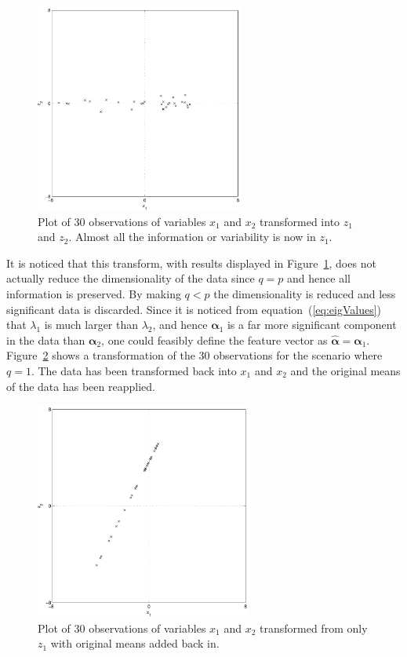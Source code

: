 \begin{figure}[!]
  \begin{center}
    \includegraphics[width=260px]{30observationsBarTrans.pdf}
    \caption{Plot of 30 observations of variables $x_1$ and $x_2$ transformed into $z_1$ and $z_2$. Almost all the information or variability is now in $z_1$.}\label{fig:30observationsBarTrans}
  \end{center}
\end{figure}

It is noticed that this transform, with results displayed in Figure~\ref{fig:30observationsBarTrans}, does not actually reduce the dimensionality of the data since $q=p$ and hence all information is preserved. By making $q<p$ the dimensionality is reduced and less significant data is discarded. Since it is noticed from equation~(\ref{eq:eigValues}) that $\lambda_1$ is much larger than $\lambda_2$, and hence $\boldsymbol\alpha_1$ is a far more significant component in the data than $\boldsymbol\alpha_2$, one could feasibly define the feature vector as $\hat{\boldsymbol\alpha} = \boldsymbol\alpha_1$. Figure~\ref{fig:30observationsFinal} shows a transformation of the 30 observations for the scenario where $q=1$. The data has been transformed back into $x_1$ and $x_2$ and the original means of the data has been reapplied.

\begin{figure}[!]
  \begin{center}
    \includegraphics[width=270px]{30observationsFinal.pdf}
    \caption{Plot of 30 observations of variables $x_1$ and $x_2$ transformed from only $z_1$ with original means added back in.}\label{fig:30observationsFinal}
  \end{center}
\end{figure}

